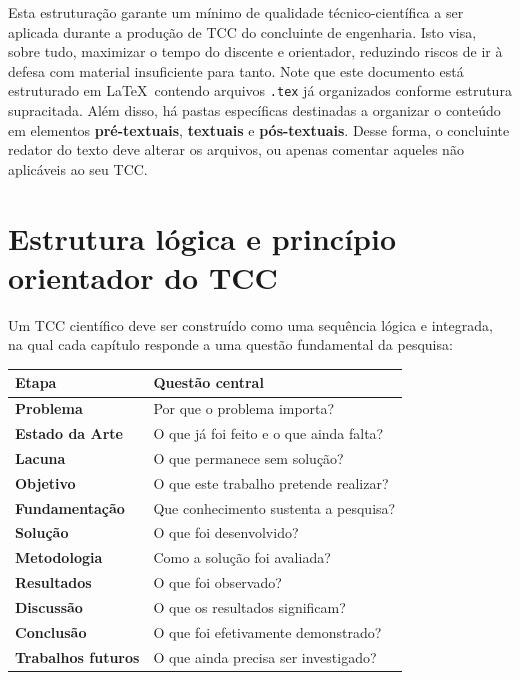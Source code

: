 Esta estruturação garante um mínimo de qualidade técnico-científica a ser aplicada durante a produção de TCC do concluinte de engenharia.
Isto visa, sobre tudo, maximizar o tempo do discente e orientador, reduzindo riscos de ir à defesa com material insuficiente para tanto. Note que este documento está estruturado em \LaTeX\ contendo arquivos \texttt{.tex} já organizados conforme estrutura supracitada. Além disso, há pastas específicas destinadas a organizar o conteúdo em elementos \textbf{pré-textuais}, \textbf{textuais} e \textbf{pós-textuais}.
Desse forma, o concluinte redator do texto deve alterar os arquivos, ou apenas comentar aqueles não aplicáveis ao seu TCC.


\section{Estrutura lógica e princípio orientador do TCC}

Um TCC científico deve ser construído como uma sequência lógica e integrada,
na qual cada capítulo responde a uma questão fundamental da pesquisa:

\begin{center}
	\begin{tabular}{>{\bfseries}p{4cm}p{9cm}}
		\toprule
		\textbf{Etapa} & \textbf{Questão central} \\
		\midrule
		Problema & Por que o problema importa? \\
		Estado da Arte & O que já foi feito e o que ainda falta? \\
		Lacuna & O que permanece sem solução? \\
		Objetivo & O que este trabalho pretende realizar? \\
		Fundamentação & Que conhecimento sustenta a pesquisa? \\
		Solução & O que foi desenvolvido? \\
		Metodologia & Como a solução foi avaliada? \\
		Resultados & O que foi observado? \\
		Discussão & O que os resultados significam? \\
		Conclusão & O que foi efetivamente demonstrado? \\
		Trabalhos futuros & O que ainda precisa ser investigado? \\
		\bottomrule
	\end{tabular}
\end{center}

